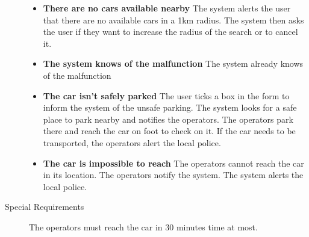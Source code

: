 \begin{description}
\begin{itemize}
				\item \textbf{There are no cars available nearby} The system alerts the user that there are no available cars in a 1km radius. The system then asks the user if they want to increase the radius of the search or to cancel it.
				\item \textbf{The system knows of the malfunction} The system already knows of the malfunction %
				\item \textbf{The car isn't safely parked} The user ticks a box in the form to inform the system of the unsafe parking. The system looks for a safe place to park nearby and notifies the operators. The operators park there and reach the car on foot to check on it. If the car needs to be transported, the operators alert the local police. 
				\item \textbf{The car is impossible to reach} The operators cannot reach the car in its location. The operators notify the system. The system alerts the local police. 
			\end{itemize}
			\item[Special Requirements] The operators must reach the car in 30 minutes time at most.
		\end{description}


